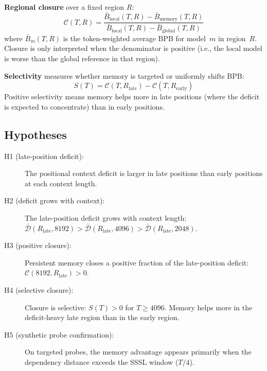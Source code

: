 \documentclass[11pt]{article}
\newcommand{\deficit}{\mathcal{D}}
\newcommand{\closure}{\mathcal{C}}
\begin{document}
\textbf{Regional closure} over a fixed region $R$:
\begin{equation}
  \closure(T, R)
  = \frac{\bar{B}_{\text{local}}(T, R) - \bar{B}_{\text{memory}}(T, R)}
         {\bar{B}_{\text{local}}(T, R) - \bar{B}_{\text{global}}(T, R)}
  \label{eq:regional_closure}
\end{equation}
where $\bar{B}_m(T, R)$ is the token-weighted average BPB for
model~$m$ in region~$R$. Closure is only interpreted when the
denominator is positive (i.e., the local model is worse than the
global reference in that region).

\textbf{Selectivity} measures whether memory is targeted or
uniformly shifts BPB:
\begin{equation}
  S(T) = \closure(T, R_{\text{late}}) - \closure(T, R_{\text{early}})
  \label{eq:selectivity}
\end{equation}
Positive selectivity means memory helps more in late positions
(where the deficit is expected to concentrate) than in early
positions.

\subsection{Hypotheses}
\label{sec:hypotheses}

\begin{description}
\item[H1 (late-position deficit):]
  The positional context deficit is larger in late positions than
  early positions at each context length.

\item[H2 (deficit grows with context):]
  The late-position deficit grows with context length:
  $\bar{\deficit}(R_{\text{late}}, 8192)
  > \bar{\deficit}(R_{\text{late}}, 4096)
  > \bar{\deficit}(R_{\text{late}}, 2048)$.

\item[H3 (positive closure):]
  Persistent memory closes a positive fraction of the late-position
  deficit: $\closure(8192, R_{\text{late}}) > 0$.

\item[H4 (selective closure):]
  Closure is selective: $S(T) > 0$ for $T \geq 4096$. Memory helps
  more in the deficit-heavy late region than in the early region.

\item[H5 (synthetic probe confirmation):]
  On targeted probes, the memory advantage appears primarily when
  the dependency distance exceeds the SSSL window ($T/4$).
\end{description}
\end{document}
